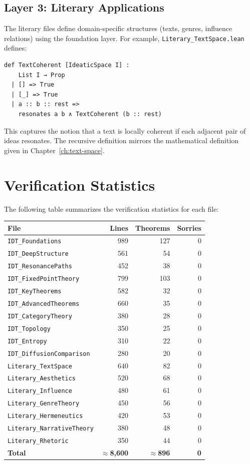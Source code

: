 \documentclass[11pt,openany]{book}
\theoremstyle{definition}
\theoremstyle{plain}
\theoremstyle{remark}
\begin{document}
\subsection{Layer 3: Literary Applications}

The literary files define domain-specific structures (texts, genres, influence relations) using the foundation layer. For example, \texttt{Literary\_TextSpace.lean} defines:

\begin{lstlisting}[language=Lean4]
def TextCoherent [IdeaticSpace I] :
    List I → Prop
  | [] => True
  | [_] => True
  | a :: b :: rest =>
    resonates a b ∧ TextCoherent (b :: rest)
\end{lstlisting}

This captures the notion that a text is locally coherent if each adjacent pair of ideas resonates. The recursive definition mirrors the mathematical definition given in Chapter~\ref{ch:text-space}.

\section{Verification Statistics}

The following table summarizes the verification statistics for each file:

\begin{center}
\begin{tabular}{lrrr}
\textbf{File} & \textbf{Lines} & \textbf{Theorems} & \textbf{Sorries} \\
\hline
\texttt{IDT\_Foundations} & 989 & 127 & 0 \\
\texttt{IDT\_DeepStructure} & 561 & 54 & 0 \\
\texttt{IDT\_ResonancePaths} & 452 & 38 & 0 \\
\texttt{IDT\_FixedPointTheory} & 799 & 103 & 0 \\
\texttt{IDT\_KeyTheorems} & 582 & 32 & 0 \\
\texttt{IDT\_AdvancedTheorems} & 660 & 35 & 0 \\
\texttt{IDT\_CategoryTheory} & 380 & 28 & 0 \\
\texttt{IDT\_Topology} & 350 & 25 & 0 \\
\texttt{IDT\_Entropy} & 310 & 22 & 0 \\
\texttt{IDT\_DiffusionComparison} & 280 & 20 & 0 \\
\texttt{Literary\_TextSpace} & 640 & 82 & 0 \\
\texttt{Literary\_Aesthetics} & 520 & 68 & 0 \\
\texttt{Literary\_Influence} & 480 & 61 & 0 \\
\texttt{Literary\_GenreTheory} & 450 & 56 & 0 \\
\texttt{Literary\_Hermeneutics} & 420 & 53 & 0 \\
\texttt{Literary\_NarrativeTheory} & 380 & 48 & 0 \\
\texttt{Literary\_Rhetoric} & 350 & 44 & 0 \\
\hline
\textbf{Total} & \textbf{$\approx$8,600} & \textbf{$\approx$896} & \textbf{0} \\
\end{tabular}
\end{center}
\end{document}

